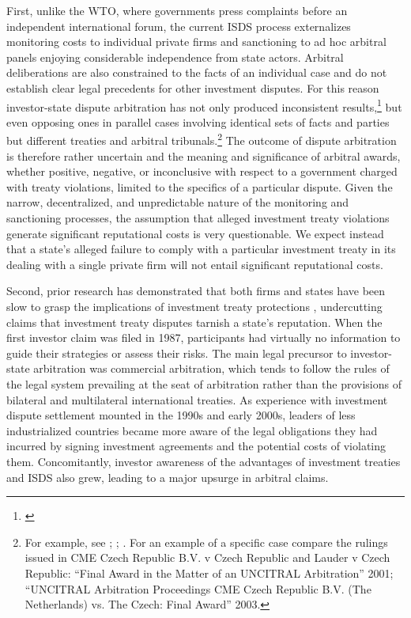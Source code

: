 \documentclass[12pt,onesided]{amsart}
\begin{document}
First, unlike the WTO, where governments press complaints before an independent international forum, the current ISDS process externalizes monitoring costs to individual private firms and sanctioning to ad hoc arbitral panels enjoying considerable independence from state actors. Arbitral deliberations are also constrained to the facts of an individual case and do not establish clear legal precedents for other investment disputes. For this reason investor-state dispute arbitration has not only produced inconsistent results,\footnote{\citet{franck:2005}} but even opposing ones in parallel cases involving identical sets of facts and parties but different treaties and arbitral tribunals.\footnote{For example, see \citet{egli2006don}; \citet{franck:2005}; \citet{kim2011annulment}. For an example of a specific case compare the rulings issued in CME Czech Republic B.V. v Czech Republic and Lauder v Czech Republic: ``Final Award in the Matter of an UNCITRAL Arbitration'' 2001; ``UNCITRAL Arbitration Proceedings CME Czech Republic B.V. (The Netherlands) vs. The Czech: Final Award'' 2003.} The outcome of dispute arbitration is therefore rather uncertain and the meaning and significance of arbitral awards, whether positive, negative, or inconclusive with respect to a government charged with treaty violations, limited to the specifics of a particular dispute. Given the narrow, decentralized, and unpredictable nature of the monitoring and sanctioning processes, the assumption that alleged investment treaty violations generate significant reputational costs is very questionable. We expect instead that a state's alleged failure to comply with a particular investment treaty in its dealing with a single private firm will not entail significant reputational costs.

Second, prior research has demonstrated that both firms and states have been slow to grasp the implications of investment treaty protections \citep{poulsen2013claim,poulsen2015bounded,yackee2010much}, undercutting claims that investment treaty disputes tarnish a state's reputation. When the first investor claim was filed in 1987, participants had virtually no information to guide their strategies or assess their risks. The main legal precursor to investor-state arbitration was commercial arbitration, which tends to follow the rules of the legal system prevailing at the seat of arbitration rather than the provisions of bilateral and multilateral international treaties. As experience with investment dispute settlement mounted in the 1990s and early 2000s, leaders of less industrialized countries became more aware of the legal obligations they had incurred by signing investment agreements and the potential costs of violating them. Concomitantly, investor awareness of the advantages of investment treaties and ISDS also grew, leading to a major upsurge in arbitral claims. 
\end{document}
